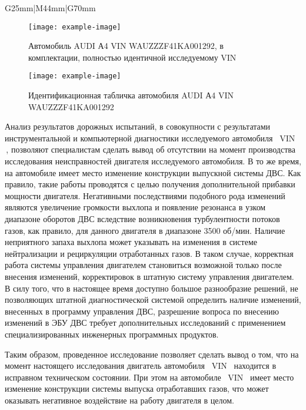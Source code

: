 {\begin{longtable}{G{25mm}|M{44mm}|G{70mm}}
  
  \begin{figure}[H]
 	\centering
 	\texttt{[image: example-image]}
 	\caption{Автомобиль AUDI А4 VIN WAUZZZF41KA001292, в комплектации, полностью идентичной исследуемому VIN \vin}
 	\label{fig:4}
 \end{figure}
 
\begin{figure}[H]
	\centering
	\texttt{[image: example-image]}
	\caption{Идентификационная табличка автомобиля  AUDI А4 VIN WAUZZZF41KA001292}
	\label{fig:4}
\end{figure}

\vspace{4mm}

Анализ результатов дорожных испытаний, в совокупности с результатами  инструментальной и компьютерной диагностики исследуемого автомобиля  \, VIN \vin\,, позволяют специалистам  сделать вывод об отсутствии на момент производства исследования неисправностей двигателя исследуемого автомобиля. В то же время, на автомобиле имеет место изменение конструкции выпускной системы ДВС. Как правило, такие работы проводятся с целью получения дополнительной прибавки мощности двигателя.  Негативными последствиями подобного рода изменений  являются увеличение громкости выхлопа и появление резонанса в узком диапазоне оборотов ДВС вследствие возникновения турбулентности потоков газов, как правило, для данного двигателя в диапазоне 3500 об/мин. Наличие неприятного запаха выхлопа может указывать на изменения в системе нейтрализации и рециркуляции  отработанных газов. В таком случае, корректная работа системы управления двигателем становиться возможной только после внесения изменений, корректировок в штатную систему управления двигателем. В силу того, что в настоящее время доступно большое разнообразие  решений, не позволяющих штатной диагностической системой определить наличие изменений, внесенных в программу управления ДВС, разрешение вопроса по внесению изменений в ЭБУ ДВС требует дополнительных исследований с применением специализированных инженерных программных  продуктов.  

Таким образом, проведенное исследование позволяет сделать вывод о том, что на момент настоящего исследования двигатель автомобиля  \, VIN \vin\, находится в исправном техническом состоянии. При этом  на автомобиле  \, VIN \vin\  имеет место изменение конструкции системы выпуска отработавших газов, что может оказывать негативное воздействие на работу двигателя в целом.


\end{longtable}}
